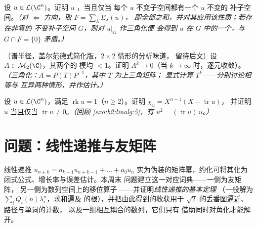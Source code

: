 \begin{exercise}[$\star\star\star$]\label{exo:b2:reduction:10}
设 $u \in \mathcal{L}(\C^n)$。证明 $u$ ，当且仅当
每个 $u$ 不变子空间都有一个 $u$ 不变的
补子空间。\emph{（对 $\Leftarrow$ 方向，取 $F = \sum_\lambda E_\lambda(u)$，
即全部之和，并对其应用该性质；若存在非零的
不变补子空间 $G$，则对 $u|_G$ 作三角化便
会得到 $u$ 在 $G$ 中的一个，与 $G \cap
F = \{0\}$ 矛盾。）}
\end{exercise}

\begin{exercise}[$\star\star\star$]\label{exo:b2:reduction:11}
（谱半径，盖尔范德式简化版，$2\times2$ 情形的分析味道，
留待后文）设 $A \in \mathcal{M}_2(\C)$，其两个的
模均 $< 1$。证明 $A^k \to 0$（当 $k \to \infty$ 时，逐元收敛）。
\emph{（三角化：$A = P(T)P^{-1}$，其中 $T$ 为上三角矩阵；
显式计算 $T^k$——分别讨论相等与
互异两种情形，并作估计。）}
\end{exercise}

\begin{exercise}[$\star\star$]\label{exo:b2:reduction:12}
设 $u \in \mathcal{L}(\C^n)$，满足 $\operatorname{rk} u = 1$（$n
\geq 2$）。证明 $\chi_u = X^{n-1}(X - \operatorname{tr} u)$，
并证明 $u$ 当且仅当 $\operatorname{tr} u
\neq 0$。\emph{（回顾 \cref{exo:b2:linalg:5}，有 $u^2 =
(\operatorname{tr} u)\,u$。）}
\end{exercise}

\section{问题：线性递推与友矩阵}

线性递推 $u_{n+k} = a_{k-1}u_{n+k-1} + \dots + a_0 u_n$
实为伪装的矩阵幂，约化可将其化为
闭式公式、增长率与误差估计。本周末
问题建立这一对应词典——一侧为友矩阵，
另一侧为数列空间上的移位算子
——并证明\emph{线性递推的基本定理}
（一般解为 $\sum_i Q_i(n)\lambda_i^n$，求和遍及
的根），并把由此得到的收获用于
$\sqrt2$ 的丢番图逼近、路径与单词的计数，
以及一组相互耦合的数列，它们只有
借助同时对角化才能解开。

